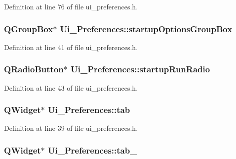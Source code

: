 Definition at line 76 of file ui\_\-preferences.h.

\hypertarget{classUi__Preferences_a6b9f14014b45e259f04af95ab2f0bab2}{
\subsubsection[{startupOptionsGroupBox}]{\setlength{\rightskip}{0pt plus 5cm}QGroupBox$\ast$ {\bf Ui\_\-Preferences::startupOptionsGroupBox}}}
\label{classUi__Preferences_a6b9f14014b45e259f04af95ab2f0bab2}


Definition at line 41 of file ui\_\-preferences.h.

\hypertarget{classUi__Preferences_a1eb4559ebb63551ec3ebd03e1209a0c1}{
\subsubsection[{startupRunRadio}]{\setlength{\rightskip}{0pt plus 5cm}QRadioButton$\ast$ {\bf Ui\_\-Preferences::startupRunRadio}}}
\label{classUi__Preferences_a1eb4559ebb63551ec3ebd03e1209a0c1}


Definition at line 43 of file ui\_\-preferences.h.

\hypertarget{classUi__Preferences_a1fe1c0c2e19204ecd2d8a61d5ae24d0c}{
\subsubsection[{tab}]{\setlength{\rightskip}{0pt plus 5cm}QWidget$\ast$ {\bf Ui\_\-Preferences::tab}}}
\label{classUi__Preferences_a1fe1c0c2e19204ecd2d8a61d5ae24d0c}


Definition at line 39 of file ui\_\-preferences.h.

\hypertarget{classUi__Preferences_ae765fc291be2c2880f6981dbf106a573}{
\subsubsection[{tab\_\-2}]{\setlength{\rightskip}{0pt plus 5cm}QWidget$\ast$ {\bf Ui\_\-Preferences::tab\_}}}
\label{classUi__Preferences_ae765fc291be2c2880f6981dbf106a573}


